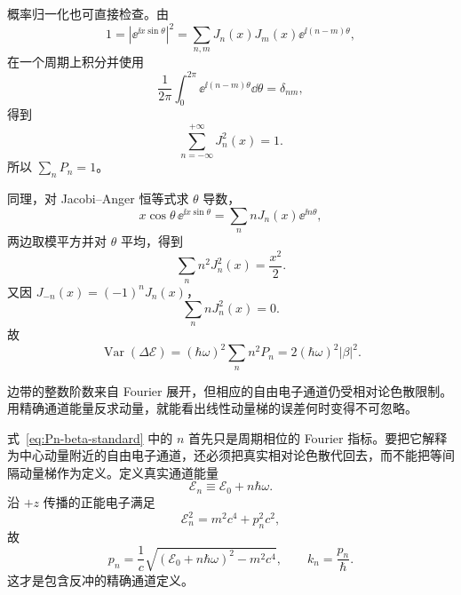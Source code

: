 概率归一化也可直接检查。由
\begin{equation}
1=\left|\ee^{\ii x\sin\theta}\right|^2
=\sum_{n,m}J_n(x)J_m(x)\ee^{\ii(n-m)\theta},
\end{equation}
在一个周期上积分并使用
\begin{equation}
\frac1{2\pi}\int_0^{2\pi}\ee^{\ii(n-m)\theta}\dd\theta=\delta_{nm},
\end{equation}
得到
\begin{equation}
{\sum_{n=-\infty}^{+\infty}J_n^2(x)=1.}
\label{eq:bessel-unitarity-identity}
\end{equation}
所以 $\sum_nP_n=1$。

同理，对 Jacobi--Anger 恒等式求 $\theta$ 导数，
\begin{equation}
x\cos\theta\,\ee^{\ii x\sin\theta}
=\sum_n nJ_n(x)\ee^{\ii n\theta},
\end{equation}
两边取模平方并对 $\theta$ 平均，得到
\begin{equation}
{\sum_n n^2J_n^2(x)=\frac{x^2}{2}.}
\label{eq:bessel-second-moment}
\end{equation}
又因 $J_{-n}(x)=(-1)^nJ_n(x)$，
\begin{equation}
{\sum_n nJ_n^2(x)=0.}
\label{eq:bessel-first-moment}
\end{equation}
故
\begin{equation}
\operatorname{Var}(\Delta\mathcal E)
=(\hbar\omega)^2\sum_n n^2P_n
=2(\hbar\omega)^2|\beta|^2.
\label{eq:pinem-energy-variance}
\end{equation}


边带的整数阶数来自 Fourier 展开，但相应的自由电子通道仍受相对论色散限制。用精确通道能量反求动量，就能看出线性动量梯的误差何时变得不可忽略。


式~\cref{eq:Pn-beta-standard} 中的 $n$ 首先只是周期相位的 Fourier 指标。要把它解释为中心动量附近的自由电子通道，还必须把真实相对论色散代回去，而不能把等间隔动量梯作为定义。定义真实通道能量
\begin{equation}
{\mathcal E_n\equiv\mathcal E_0+n\hbar\omega.}
\label{eq:exact-channel-energy}
\end{equation}
沿 $+z$ 传播的正能电子满足
\begin{equation}
\mathcal E_n^2=m^2c^4+p_n^2c^2,
\end{equation}
故
\begin{equation}
{
p_n=\frac1c\sqrt{(\mathcal E_0+n\hbar\omega)^2-m^2c^4},
\qquad
k_n=\frac{p_n}{\hbar}.}
\label{eq:exact-channel-momentum}
\end{equation}
这才是包含反冲的精确通道定义。

